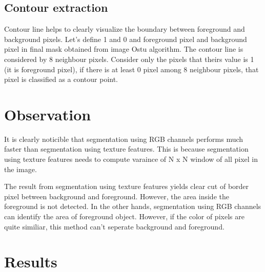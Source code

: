 \documentclass[11pt]{article}
\begin{document}

\subsection*{Contour extraction}

Contour line helps to clearly visualize the boundary between foreground and background pixels. Let's define 1 and 0 and foreground pixel and background pixel in final mask obtained from image Ostu algorithm. The contour line is considered by 8 neighbour pixels. Consider only the pixels that theirs value is 1 (it is foreground pixel), if there is at least 0 pixel among 8 neighbour pixels, that pixel is classified as a contour point. 


\section*{Observation}

It is clearly noticible that segmentation using  RGB channels performs much faster than segmentation using texture features. This is because segmentation using texture features needs to compute varaince of N x N window of all pixel in the image.

The result from segmentation using texture features yields clear cut of border pixel between background and foreground. However, the area inside the foreground is not detected. In the other hands, segmentation using  RGB channels can identify the area of foreground object. However, if the color of pixels are quite similiar, this method can't seperate background and foreground.



\section*{Results}
\end{document}
